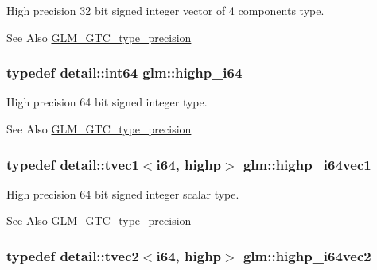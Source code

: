 High precision 32 bit signed integer vector of 4 components type. \begin{DoxySeeAlso}{See Also}
\hyperlink{group__gtc__type__precision}{G\-L\-M\-\_\-\-G\-T\-C\-\_\-type\-\_\-precision} 
\end{DoxySeeAlso}
\hypertarget{group__gtc__type__precision_gad3cb9a0ac0266ea2c51c6fac256345d1}{
\subsubsection[{highp\-\_\-i64}]{\setlength{\rightskip}{0pt plus 5cm}typedef detail\-::int64 {\bf glm\-::highp\-\_\-i64}}}\label{group__gtc__type__precision_gad3cb9a0ac0266ea2c51c6fac256345d1}
High precision 64 bit signed integer type. \begin{DoxySeeAlso}{See Also}
\hyperlink{group__gtc__type__precision}{G\-L\-M\-\_\-\-G\-T\-C\-\_\-type\-\_\-precision} 
\end{DoxySeeAlso}
\hypertarget{group__gtc__type__precision_ga06c21aba992669f5c160ec5f5a480522}{
\subsubsection[{highp\-\_\-i64vec1}]{\setlength{\rightskip}{0pt plus 5cm}typedef detail\-::tvec1$<$i64, highp$>$ {\bf glm\-::highp\-\_\-i64vec1}}}\label{group__gtc__type__precision_ga06c21aba992669f5c160ec5f5a480522}
High precision 64 bit signed integer scalar type. \begin{DoxySeeAlso}{See Also}
\hyperlink{group__gtc__type__precision}{G\-L\-M\-\_\-\-G\-T\-C\-\_\-type\-\_\-precision} 
\end{DoxySeeAlso}
\hypertarget{group__gtc__type__precision_gabfe3aa6fa4003a47577beb9678ab2661}{
\subsubsection[{highp\-\_\-i64vec2}]{\setlength{\rightskip}{0pt plus 5cm}typedef detail\-::tvec2$<$i64, highp$>$ {\bf glm\-::highp\-\_\-i64vec2}}}\label{group__gtc__type__precision_gabfe3aa6fa4003a47577beb9678ab2661}
